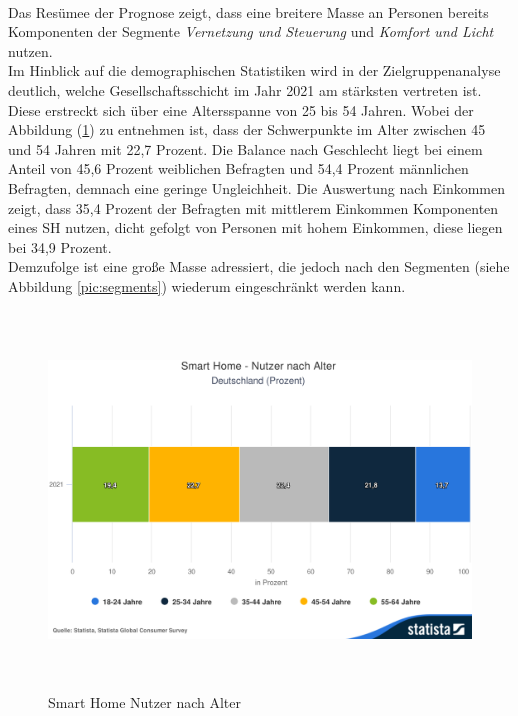         \\
        Das Resümee der Prognose zeigt, dass eine breitere Masse an Personen bereits Komponenten der Segmente 
        \textit{Vernetzung und Steuerung} und \textit{Komfort und Licht} nutzen.
        \\
        \linebreak
        Im Hinblick auf die demographischen Statistiken wird in der Zielgruppenanalyse deutlich, welche Gesellschaftsschicht 
        im Jahr 2021 am stärksten vertreten ist. Diese erstreckt sich über eine Altersspanne von 25 bis 54 Jahren. 
        Wobei der Abbildung (\ref{pic:ageSH}) zu entnehmen ist, dass der Schwerpunkte im Alter zwischen 45 und 54 Jahren 
        mit 22,7 Prozent. Die Balance nach Geschlecht liegt bei einem Anteil von 45,6 Prozent weiblichen Befragten und 
        54,4 Prozent männlichen Befragten, demnach eine geringe Ungleichheit. Die Auswertung nach Einkommen zeigt, dass 
        35,4 Prozent der Befragten mit mittlerem Einkommen Komponenten eines \acl{SH} nutzen, dicht gefolgt von 
        Personen mit hohem Einkommen, diese liegen bei 34,9 Prozent. 
        \\
        \linebreak
        Demzufolge ist eine große Masse adressiert, die jedoch nach den Segmenten (siehe Abbildung \ref{pic:segments}) 
        wiederum eingeschränkt werden kann.
        \pagebreak
        \begin{figure}[hbt!]
            \centering
            \includegraphics[width=15cm,height=10cm,keepaspectratio]{images/Statista-Outlook-Smart-Home---Nutzer-nach-Alter-Deutschland-Prozent.png}
            \caption{Smart Home Nutzer nach Alter \cite{statista2021}} 
            \label{pic:ageSH}
        \end{figure}
